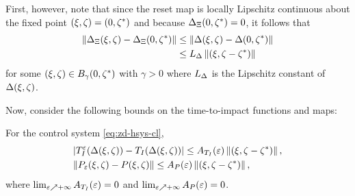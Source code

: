 First, however, note that since the reset map is locally Lipschitz continuous
about the fixed point $(\xi, \zeta) = (0, \zeta^{*})$ and because $\Delta_{\Xi}(0, \zeta^{*}) = 0$, it
follows that
%
\begin{align} 
  \nonumber
  \left\| \Delta_{\Xi}(\xi, \zeta) - \Delta_{\Xi}(0, \zeta^{*}) \right\| &\leq \left\| \Delta(\xi, \zeta) -
    \Delta(0, \zeta^{*}) \right\|\\
  \label{eq:impact-Lipschitz}
  &\leq L_{\Delta} \left\|(\xi, \zeta - \zeta^{*})\right\|
\end{align}
%
for some $(\xi, \zeta) \in B_{\gamma}(0, \zeta^{*})$ with $\gamma > 0$ where $L_{\Delta}$ is the
Lipschitz constant of $\Delta(\xi, \zeta)$.

Now, consider the following bounds on the time-to-impact functions and
\Poincare{} maps:

\begin{lemma}
  \label{lemma:TIe-P-bounds}
  For the control system \eqref{eq:zd-hsys-cl},
  \begin{eqnarray*}
    &| T_{I}^{\varepsilon}(\Delta(\xi, \zeta)) - T_{I}(\Delta(\xi, \zeta)) | \leq A_{T_{I}}(\varepsilon) \left\|(\xi, \zeta - \zeta^{*})\right\|,\\
    &\| P_{\varepsilon}(\xi, \zeta) - P(\xi, \zeta) \| \leq A_{P}(\varepsilon) \left\|(\xi, \zeta - \zeta^{*})\right\|,
  \end{eqnarray*}
  where $\lim_{\varepsilon \nearrow +\infty} A_{T_{I}}(\varepsilon) = 0$ and $\lim_{\varepsilon \nearrow +\infty}A_{P}(\varepsilon) = 0$.\vgap
\end{lemma}

